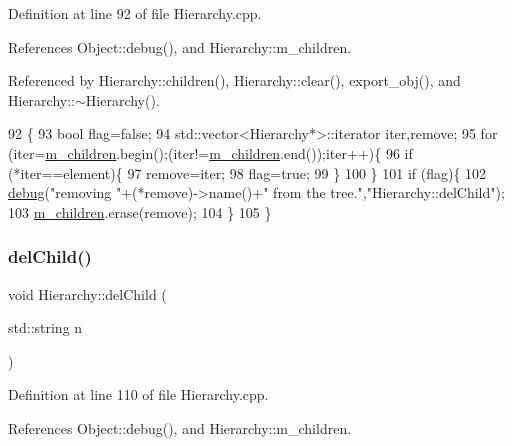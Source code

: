 Definition at line 92 of file Hierarchy.\+cpp.



References Object\+::debug(), and Hierarchy\+::m\+\_\+children.



Referenced by Hierarchy\+::children(), Hierarchy\+::clear(), export\+\_\+obj(), and Hierarchy\+::$\sim$\+Hierarchy().


\begin{DoxyCode}
92                                           \{
93   \textcolor{keywordtype}{bool} flag=\textcolor{keyword}{false};
94   std::vector<Hierarchy*>::iterator iter,\textcolor{keyword}{remove};
95   \textcolor{keywordflow}{for} (iter=\hyperlink{classHierarchy_a038816763941fd4a930504917f60483b}{m\_children}.begin();(iter!=\hyperlink{classHierarchy_a038816763941fd4a930504917f60483b}{m\_children}.end());iter++)\{
96     \textcolor{keywordflow}{if} (*iter==element)\{
97       \textcolor{keyword}{remove}=iter;
98       flag=\textcolor{keyword}{true};
99     \}
100   \}
101   \textcolor{keywordflow}{if} (flag)\{
102     \hyperlink{classObject_aac010553f022165573714b7014a15f0d}{debug}(\textcolor{stringliteral}{"removing "}+(*remove)->name()+\textcolor{stringliteral}{" from the tree."},\textcolor{stringliteral}{"Hierarchy::delChild"});
103     \hyperlink{classHierarchy_a038816763941fd4a930504917f60483b}{m\_children}.erase(\textcolor{keyword}{remove});
104   \}
105 \}
\end{DoxyCode}
\mbox{\label{classHierarchy_a1928ac7615fe0b5e55cd707f70dc6781}} 
\subsubsection{\texorpdfstring{del\+Child()}{delChild()}\hspace{0.1cm}{\footnotesize\ttfamily [2/2]}}
{\footnotesize\ttfamily void Hierarchy\+::del\+Child (\begin{DoxyParamCaption}\item[{std\+::string}]{n }\end{DoxyParamCaption})\hspace{0.3cm}{\ttfamily [inherited]}}



Definition at line 110 of file Hierarchy.\+cpp.



References Object\+::debug(), and Hierarchy\+::m\+\_\+children.


